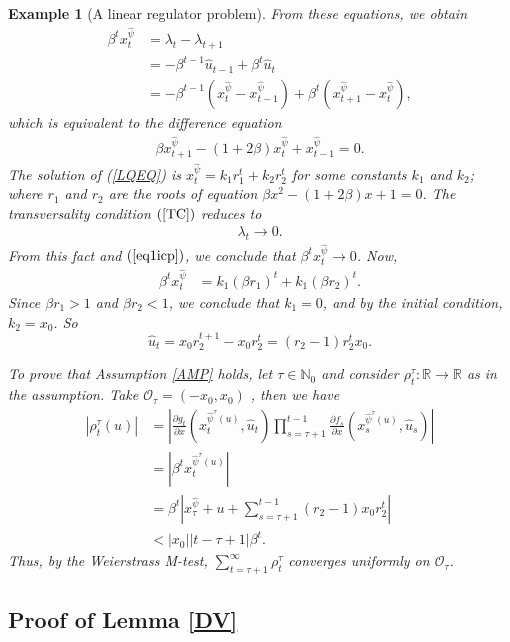 \documentclass[3p]{elsarticle}
\newcommand{\rz}{\mathbb R}
\newcommand{\nat}{\mathbb N_0}
\newtheorem{examp}[thm]{Example}
\begin{document}
\begin{examp}[A linear regulator problem]
		From these equations, we obtain 
		\begin{align*}
		\beta^tx^{\hat{\psi}}_t&=\lambda_t-\lambda_{t+1}\\
		&=-\beta^{t-1}\hat u_{t-1}+\beta^t\hat u_t\\
		&=-\beta^{t-1}(x_t^{\hat{\psi}}-x^{\hat{\psi}}_{t-1})+\beta^t(x^{\hat{\psi}}_{t+1}-x^{\hat{\psi}}_{t}),
		\end{align*}
		which is equivalent to the difference equation
		\begin{align}\label{LQEQ}
		\beta x^{\hat{\psi}}_{t+1}-(1+2\beta)x^{\hat{\psi}}_t+x^{\hat{\psi}}_{t-1}=0.
		\end{align}
		The solution of (\ref{LQEQ}) is $x^{\hat{\psi}}_t=k_1r_1^t+k_2r_2^t$ for some constants $k_1$ and $k_2$; where $r_1$ and $r_2$ are the roots of equation $\beta x^2-(1+2\beta)x+1=0$.
		The transversality condition $(\ref{TC})$ reduces to
		\begin{align*}
		\lambda_t\to0.
		\end{align*}
		From this fact and  $(\ref{eq1icp})$, we conclude that $\beta^t x_t^{\hat{\psi}}\to 0$. Now, 
		\begin{align*}
		\beta^tx^{\hat{\psi}}_t&=k_1(\beta r_1)^t+k_1(\beta r_2)^t.
		\end{align*}
		Since $\beta r_1>1 $ and $\beta r_2<1$, we conclude that  $k_1=0$, and by the initial condition, $k_2=x_0$.
		So $$\displaystyle\hat u_t=x_0r_2^{t+1}-x_0r_2^t=(r_2-1)r_2^tx_0.$$
		
		
		To prove that Assumption \ref{AMP} holds, let $\tau\in\nat$ and consider $\rho_t^\tau:\rz\to\rz$ as in the assumption. Take $\mathcal O_\tau=(-x_0,x_0)$ , then we have
		\begin{align*}
		\left|\rho_{t}^{\tau}(u)\right|&=\left|\frac{\partial g_t}{\partial x}( x_t^{{\hat\psi^\tau(u)}}, \hat u_t)\prod_{s=\tau+1}^{t-1}\frac{\partial f_s}{\partial x}(x_s^{{\hat \psi^\tau(u)}}, \hat u_s)\right|\\
		&=\left|\beta^tx_t^{\hat\psi^\tau(u)}\right|\\
		&=\beta^t\left|x_\tau^{\hat\psi}+u+\sum_{s=\tau+1}^{t-1}(r_2-1)x_0r_2^t\right|\\
		&<\left|x_0\right||t-\tau+1|\beta^t.
		\end{align*}
		Thus, by the Weierstrass M-test, $\displaystyle\sum_{t=\tau+1}^{\infty}\rho^\tau_t$ converges uniformly on $\mathcal O_\tau$.
	\end{examp}
	
	\subsection{Proof of Lemma \ref{DV}}\label{secproo}
	
\end{document}
